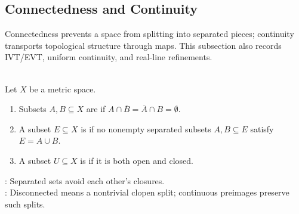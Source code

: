\subsection{Connectedness and Continuity}\label{subsec:connectedness-and-continuity}

%


Connectedness prevents a space from splitting into separated pieces; continuity transports topological structure through maps. This subsection also records IVT/EVT, uniform continuity, and real-line refinements.

\begin{definition} \label{def:separated-and-connected-sets} \\
Let $X$ be a metric space.
\begin{enumerate}[label=(\roman*)]
\setlength{\itemsep}{0pt}
\item Subsets $A,B\subseteq X$ are  if $A\cap\overline{B}=\overline{A}\cap B=\emptyset$.
\item A subset $E\subseteq X$ is  if no nonempty separated subsets $A,B\subseteq E$ satisfy $E=A\cup B$.
\item A subset $U\subseteq X$ is  if it is both open and closed.
\end{enumerate}
: Separated sets avoid each other's closures.\\
: Disconnected means a nontrivial clopen split; continuous preimages preserve such splits.
\end{definition}


